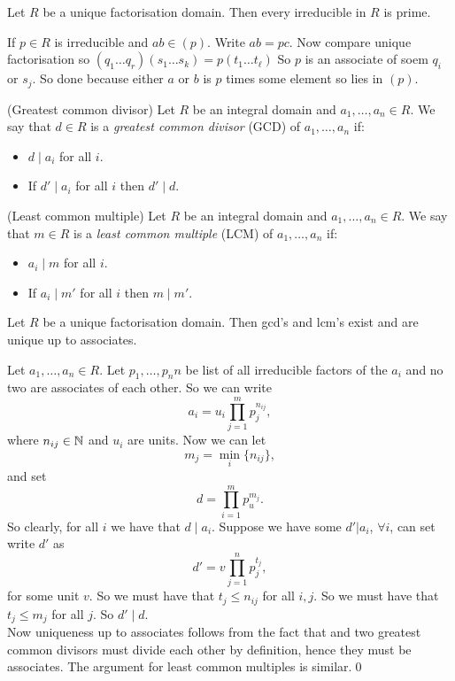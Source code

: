 \documentclass{article}
\begin{document}
\begin{itemize}
\begin{claim}
  Let $ R $ be a unique factorisation domain. Then every irreducible in $ R $ is prime.
\end{claim}
If $ p\in R $ is irreducible and $ ab\in (p) $. Write $ ab=pc $. Now compare unique factorisation so $ (q_1\dots q_r)(s_1\dots s_k)=p(t_1\dots t_\ell) $ So $ p $ is an associate of soem $ q_i $ or $ s_j $. So done because either $ a $ or $ b $ is $ p $ times some element so lies in $ (p) $.
\begin{definition}
	(Greatest common divisor) Let $ R $ be an integral domain and $ a_1,\dots, a_n\in R $. We say that $ d\in  R $ is a \textit{greatest common divisor} (GCD) of $ a_1, \dots, a_n $ if:
        \begin{itemize}
 	         \item $ d\mid a_i $ for all $ i $.
	         \item If $ d'\mid a_i $ for all $ i $ then $ d'\mid d $.
        \end{itemize}
\end{definition}
\begin{definition}
	(Least common multiple) Let $ R $ be an integral domain and $ a_1,\dots, a_n\in R $. We say that $ m\in R $ is a \textit{least common multiple} (LCM) of $ a_1,\dots, a_n $ if:
	\begin{itemize}
		\item $ a_i\mid m $ for all $ i $.
		\item If $ a_i\mid m' $ for all $ i $ then $ m\mid m' $.
	\end{itemize}	
\end{definition}
\begin{theorem}
  Let $ R $ be a unique factorisation domain. Then gcd's and lcm's exist and are unique up to associates.
\end{theorem}
\pf Let $ a_1,\dots,a_n\in R $. Let $ p_1,\dots,p_nn $ be list of all irreducible factors of the $ a_i $ and no two are associates of each other. So we can write
\[
	a_i=u_i\prod_{j=1}^mp_j^{n_{ij}},
\]
where $ n_{ij}\in \mathbb{N} $ and $ u_i $ are units. Now we can let
\[
	m_j=\min_i\{n_{ij}\},
\]
and set
\[
	d=\prod_{i=1}^mp_u^{m_j}.
\]
So clearly, for all $ i $ we have that $ d\mid a_i $. Suppose we have some $ d'|a_i $, $ \forall i $, can set write $ d' $ as
\[
	d'=v\prod_{j=1}^np_j^{t_j},
\]
for some unit $ v $. So we must have that $ t_j\le n_{ij} $ for all $ i,j $. So we must have that $ t_j\le m_j $ for all $ j $. So $ d'\mid d $.\\
Now uniqueness up to associates follows from the fact that and two greatest common divisors must divide each other by definition, hence they must be associates. The argument for least common multiples is similar.\qed

\end{itemize}
\end{document}
